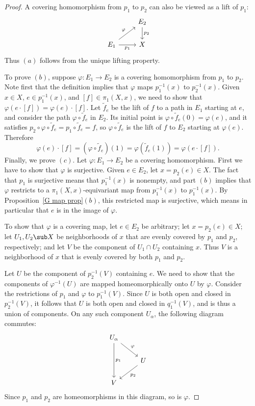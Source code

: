 \begin{proof}
A covering homomorphism from $p_1$ to $p_2$ can also be viewed as a lift of $p_1$:
\[\begin{tikzcd}
&E_2\ar[d,"p_2"]\\
E_1\ar[ru,"\varphi"]\ar[r,swap,"p_1"]&X
\end{tikzcd}\]
Thus $(a)$ follows from the unique lifting property.\par
To prove $(b)$, suppose $\varphi:E_1\to E_2$ is a covering homomorphism from $p_1$ to $p_2$. Note first that the definition implies that $\varphi$ maps $p^{-1}_1(x)$ to $p^{-1}_2(x)$. Given $x\in X$, $e\in p_1^{-1}(x)$, and $[f]\in\pi_1(X,x)$, we need to show that $\varphi(e\cdot[f])=\varphi(e)\cdot[f]$. Let $\widetilde{f}_e$ be the lift of $f$ to a path in $E_1$ starting at $e$, and consider the path $\varphi\circ\widetilde{f}_e$ in $E_2$. Its initial point is $\varphi\circ\widetilde{f}_e(0)=\varphi(e)$, and it satisfies $p_2\circ\varphi\circ\widetilde{f}_e=p_1\circ\widetilde{f}_e=f$, so $\varphi\circ\widetilde{f}_e$ is the lift of $f$ to $E_2$ starting at $\varphi(e)$. Therefore
\[\varphi(e)\cdot[f]=(\varphi\circ\widetilde{f}_e)(1)=\varphi(\widetilde{f}_e(1))=\varphi(e\cdot[f]).\]
Finally, we prove $(c)$. Let $\varphi:E_1\to E_2$ be a covering homomorphism. First we
have to show that $\varphi$ is surjective. Given $e\in E_2$, let $x=p_2(e)\in X$. The fact that $p_1$ is surjective means that $p_1^{-1}(x)$ is nonempty, and part $(b)$ implies that $\varphi$ restricts to a $\pi_1(X,x)$-equivariant map from $p_1^{-1}(x)$ to $p_1^{-1}(x)$. By Proposition~\ref{G map prop}$(b)$, this restricted map is surjective, which means in particular that $e$ is in the image of $\varphi$.\par 
To show that $\varphi$ is a covering map, let $e\in E_2$ be arbitrary; let $x=p_2(e)\in X$; let $U_1,U_2\sub X$ be neighborhoods of $x$ that are evenly covered by $p_1$ and $p_2$, respectively; and let $V$ be the component of $U_1\cap U_2$ containing $x$. Thus $V$ is a neighborhood of $x$ that is evenly covered by both $p_1$ and $p_2$.\par
Let $U$ be the component of $p_2^{-1}(V)$ containing $e$. We need to show that the
components of $\varphi^{-1}(U)$ are mapped homeomorphically onto $U$ by $\varphi$. Consider the restrictions of $p_1$ and $\varphi$ to $p_1^{-1}(V)$. Since $U$ is
both open and closed in $p_2^{-1}(V)$, it follows that $U$ is both open and closed in $q_1^{-1}(V)$, and is thus a union of components. On any such component $U_\alpha$, the following diagram commutes:
\[\begin{tikzcd}
U_\alpha\ar[dd,"p_1"]\ar[rd,"\varphi"]&\\
&U\ar[ld,"p_2"]\\
V
\end{tikzcd}\]
Since $p_1$ and $p_2$ are homeomorphisms in this diagram, so is $\varphi$.
\end{proof}
